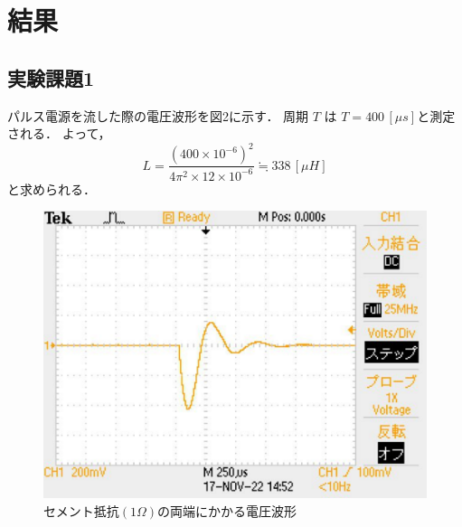 
\section{結果}

\subsection{実験課題1}
パルス電源を流した際の電圧波形を図2に示す．
周期 $T$ は $T=400\,[\si{\mu s}]$と測定される．
よって，
$$
L=\frac{(400\times10^{-6})^2}{4\pi^2\times12\times10^{-6}}\fallingdotseq 338\,[\mu H]
$$
と求められる．
\begin{figure}[H]
    \begin{center}
        \includegraphics[scale=0.5]{figure2.pdf}
        \caption{セメント抵抗$(1\Omega)$の両端にかかる電圧波形}
    \end{center}
\end{figure}
\newpage

